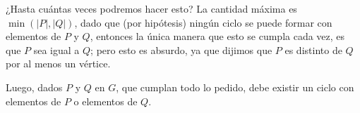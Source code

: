 \documentclass{article}
\begin{document}
¿Hasta cuántas veces podremos hacer esto? La cantidad máxima es $\min(|P|,|Q|)$, dado que (por hipótesis) ningún ciclo se puede formar con elementos de $P$ y $Q$, entonces la única manera que esto se cumpla cada vez, es que $P$ sea igual a $Q$; pero esto es absurdo, ya que dijimos que $P$ es distinto de $Q$ por al menos un vértice.

Luego, dados $P$ y $Q$ en $G$, que cumplan todo lo pedido, debe existir un ciclo con elementos de $P$ o elementos de $Q$.
\end{document}
